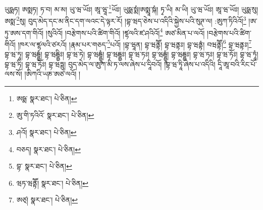 ཡུཥྨཏ། ཨསྨཏ། ཏ་བ། མ་མ། ཡུ་ཝ་ཡོཿ། ཨཱ་ཝཱ་\footnote{ཨཥྨ་  སྣར་ཐང་།  པེ་ཅིན། }ཡོཿ། ཡུཥྨ་སྨཾ།ཨསྨཱ་སྐཾ། ཏྭ་ཡི། མ་ཡི། ཡུ་ཝ་ཡོཿ། ཨཱ་ཝ་ཡོཿ། ཡུཥྨ་སུ། ཨསྨ་\footnote{ཨུ་གི་ཏའིའོ་  སྣར་ཐང་།  པེ་ཅིན། }སུ། བུད་མེད་དང་མ་ནིང་དག་ལའང་དེ་ལྟར་རོ། །བྷ་ཝད་ཅེས་པ་འདིའི་སྐྱེས་པའི་སུཊ་ལ། :ཨུཀ་ཏིའིའོ།\footnote{ཤའོ།  སྣར་ཐང་།  པེ་ཅིན། } །ཨ་ཏུ་ཨས་དག་གིའོ། །སུའིའོ། །བརྩེགས་པའི་ཚིག་གིའོ། །ཛྷལའི་ཛ་ཤའིའོ།\footnote{བཅད།  སྣར་ཐང་།  པེ་ཅིན། } ཨཙ་མིན་པ་ལའོ། །བརྩེགས་པའི་ཚིག་གིའོ། །ཁར་ལ་ཛྷལའི་ཙརའོ། །རྣམ་པར་གཅད་\footnote{བྷ་  སྣར་ཐང་།  པེ་ཅིན། }པའོ། །བྷ་ཝཱན། བྷ་ཝནྟཽ། བྷ་ཝནྟཿ། བྷ་ཝནྟཾ། བཝནྟཽ།\footnote{ཝཏ་ཝནྟཽ།  སྣར་ཐང་།  པེ་ཅིན། } བྷ་ཝནྟཿ།\footnote{ཨཙ྄།  སྣར་ཐང་།  པེ་ཅིན། } བྷ་ཝ་ཏཱ། བྷ་ཝདྦྷྱཾ། བྷ་ཝདྦྷྱིཿ། བྷ་ཝ་ཏེ། བྷ་ཝདྦྷྱཱཾ། བྷ་ཝདྦྷྱཿ། བྷ་ཝ་ཏཿ། བྷ་ཝདྦྷྱཱཾ། བྷ་ཝདྦྷྱཿ། བྷ་ཝ་ཏཿ། བྷ་ཝ་ཏོཿ། བྷ་ཝ་ཏཱཾ། བྷ་ཝ་ཏི། བྷ་ཝ་ཏོཿ། བྷ་ཝཏྶུ། བུད་མེད་ལ་ཨུཀ་མི་ཏ་ལས་ཞེས་པ་དཱིབའོ། །བྷ་ཝ་ཏཱི་ཞེས་པ་འདིའི། དཱི་ཨཱ་བའི་རིང་པོ་ལས་སོ། །ཨིཀའི་ཡཎ་ཨཙ་ལའོ། །

